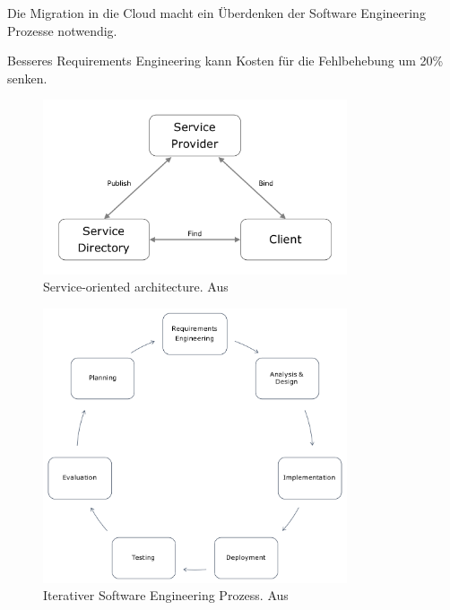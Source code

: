 Die Migration in die Cloud macht ein Überdenken der Software Engineering 
Prozesse notwendig. 

Besseres Requirements Engineering kann Kosten für die Fehlbehebung um 20\% 
senken.

\begin{figure}[!h]
\begin{center}
\includegraphics[width=0.8\textwidth]{images/soa_architecture.png}
\caption{Service-oriented architecture. Aus 
\protect{}}
\label{fig:soa_architecture}
\end{center}
\end{figure}

\begin{figure}[!h]
\begin{center}
\includegraphics[width=0.8\textwidth]{images/iterative_se_process.png}
\caption{Iterativer Software Engineering Prozess. Aus 
\protect{}}
\label{fig:iterative_se_process}
\end{center}
\end{figure}

